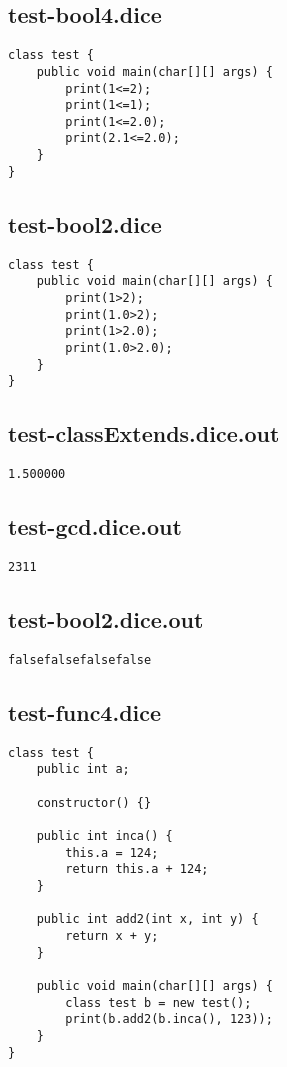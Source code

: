 \subsection{test-bool4.dice}
\begin{verbatim}
class test {
	public void main(char[][] args) {
		print(1<=2);
		print(1<=1);
		print(1<=2.0);
		print(2.1<=2.0);
	}
}
\end{verbatim}
\pagebreak
\subsection{test-bool2.dice}
\begin{verbatim}
class test {
	public void main(char[][] args) {
		print(1>2);
		print(1.0>2);
		print(1>2.0);
		print(1.0>2.0);
	}
}
\end{verbatim}
\pagebreak
\subsection{test-classExtends.dice.out}
\begin{verbatim}
1.500000
\end{verbatim}
\pagebreak
\subsection{test-gcd.dice.out}
\begin{verbatim}
2311
\end{verbatim}
\pagebreak
\subsection{test-bool2.dice.out}
\begin{verbatim}
falsefalsefalsefalse
\end{verbatim}
\pagebreak
\subsection{test-func4.dice}
\begin{verbatim}
class test {
	public int a;

	constructor() {}

	public int inca() { 
		this.a = 124;
		return this.a + 124; 
	} 

	public int add2(int x, int y) {
		return x + y;
	}

	public void main(char[][] args) {
		class test b = new test();
	  	print(b.add2(b.inca(), 123));
	}
}

\end{verbatim}
\pagebreak
